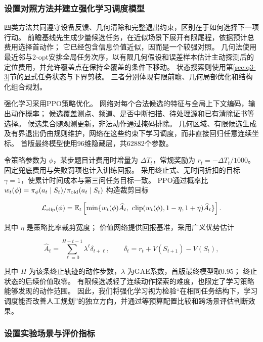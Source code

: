\subsubsection{设置对照方法并建立强化学习调度模型}\label{sec:q3-7}

四类方法共同遵守设备反馈、几何清除和完整退出约束，区别在于如何选择下一项行动。
前瞻基线先生成少量候选任务，在近似场景下展开有限尾程，依据预计总费用选择首动作；
它已经包含信息价值近似，因而是一个较强对照。
几何法使用最近邻与2-opt安排全局任务次序，以有限几何假设和误差样本估计主动探测后的定位费用，并允许覆盖点在保持全覆盖的条件下移动。
状态搜索则使用第\ref{sec:q3-3}节的显式任务状态与下界剪枝。
三者分别体现有限前瞻、几何局部优化和结构化组合规划。

强化学习采用PPO策略优化\cite{schulman2017ppo}。
网络对每个合法候选的特征与全局上下文编码，输出动作概率；
候选覆盖测点、频道、是否中断扫描、待处理源和已有清除证书等选择。
候选集合随观测更新，非法动作通过掩码排除。
几何区域、有限候选生成及有界退出仍由规则维护，网络在这些约束下学习调度，而非直接回归任意连续坐标。
首版最终模型使用96维隐藏层，共62882个参数。

令策略参数为 \(\phi\)，某步题目计费用时增量为 \(\Delta T_t\)，常规奖励为 \(r_t=-\Delta T_t/1000\)。
固定兜底费用与失败罚项也计入训练回报。
采用终止式、无时间折扣的目标 \(\gamma=1\)，使累计时间成本与第三问任务目标一致。
PPO通过概率比 \(w_t(\phi)=\pi_\phi(a_t\mid S_t)/\pi_{\rm old}(a_t\mid S_t)\) 构造裁剪目标

\begin{equation}\label{eq:q3-15}
\mathcal L_{\rm clip}(\phi)=\mathbb E_t\left[
\min\{w_t(\phi)\widehat A_t,\ 
\operatorname{clip}(w_t(\phi),1-\eta,1+\eta)\widehat A_t\}
\right].
\end{equation}

其中 \(\eta\) 是策略比率裁剪宽度；
价值网络提供回报基准，采用广义优势估计\cite{schulman2016gae}

\begin{equation}\label{eq:q3-16}
\widehat A_t=\sum_{\ell=0}^{H-t-1}\lambda^\ell\delta_{t+\ell},
\qquad \delta_t=r_t+V(S_{t+1})-V(S_t),
\end{equation}

其中 \(H\) 为该条终止轨迹的动作步数，\(\lambda\) 为GAE系数，首版最终模型取0.95；
终止状态的后续价值取零。
有限候选减轻了连续动作探索的难度，也限定了学习策略能够发现的动作范围。
因此，我们将强化学习视为检验``在相同任务结构下，学习调度能否改善人工规划''的独立方向，并通过等预算配置比较和跨场景评估判断效果。

\subsubsection{设置实验场景与评价指标}\label{sec:q3-8}


